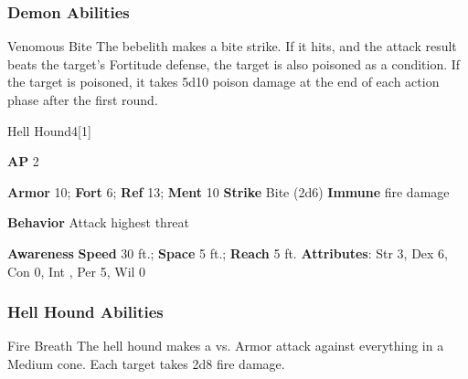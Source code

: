 \subsubsection{Demon Abilities}

\begin{freeability}{Venomous Bite}
The bebelith makes a bite strike.
If it hits, and the attack result beats the target's Fortitude defense, the target is also poisoned as a condition.
If the target is poisoned, it takes 5d10 poison damage at the end of each action phase after the first round.
\end{freeability}

\begin{monsection}{Hell Hound}{4}[1]
\vspace{-1em}\vspace{-1em}
\begin{spellcontent}
\begin{spelltargetinginfo}
{\textbf{AP} 2}

\pari \textbf{Armor} 10;
\textbf{Fort} 6;
\textbf{Ref} 13;
\textbf{Ment} 10
\pari \textbf{Strike} Bite  (2d6)
\pari \textbf{Immune} fire damage


\pari \textbf{Behavior} Attack highest threat
\end{spelltargetinginfo}
\end{spellcontent}

\begin{monsterfooter}
\pari \textbf{Awareness} 
\pari \textbf{Speed} 30 ft.;
\textbf{Space} 5 ft.;
\textbf{Reach} 5 ft.
\pari \textbf{Attributes}:
Str 3,
Dex 6,
Con 0,
Int ,
Per 5,
Wil 0
\end{monsterfooter}
\end{monsection}


\subsubsection{Hell Hound Abilities}

\begin{freeability}{Fire Breath}
The hell hound makes a  vs. Armor attack against everything in a Medium cone.
\hit Each target takes 2d8 fire damage.
\end{freeability}

